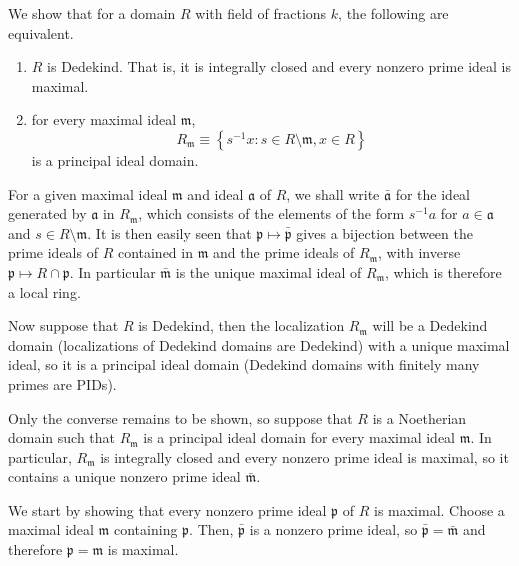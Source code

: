 \documentclass[12pt]{article}
\begin{document}
We show that for a  domain $R$ with field of fractions $k$, the following are equivalent.
\begin{enumerate}
\item $R$ is Dedekind. That is, it is integrally closed and every nonzero prime ideal is maximal.
\item for every maximal ideal $\mathfrak{m}$,
\begin{equation*}
R_\mathfrak{m}\equiv\left\{s^{-1}x:s\in R\setminus\mathfrak{m},x\in R\right\}
\end{equation*}
is a principal ideal domain.
\end{enumerate}

For a given maximal ideal $\mathfrak{m}$ and ideal $\mathfrak{a}$ of $R$, we shall write $\mathfrak{\bar a}$ for the ideal generated by $\mathfrak{a}$ in $R_\mathfrak{m}$, which consists of the elements of the form $s^{-1}a$ for $a\in\mathfrak{a}$ and $s\in R\setminus\mathfrak{m}$. It is then easily seen that $\mathfrak{p}\mapsto \mathfrak{\bar p}$ gives a bijection between the prime ideals of $R$ contained in $\mathfrak{m}$ and the prime ideals of $R_\mathfrak{m}$, with inverse $\mathfrak{p}\mapsto R\cap\mathfrak{p}$. In particular $\mathfrak{\bar m}$ is the unique maximal ideal of $R_\mathfrak{m}$, which is therefore a local ring.

Now suppose that $R$ is Dedekind, then the localization $R_\mathfrak{m}$ will be a Dedekind domain (localizations of Dedekind domains are Dedekind) with a unique maximal ideal, so it is a principal ideal domain (Dedekind domains with finitely many primes are PIDs).

Only the converse remains to be shown, so suppose that $R$ is a Noetherian domain such that $R_\mathfrak{m}$ is a principal ideal domain for every maximal ideal $\mathfrak{m}$. In particular, $R_\mathfrak{m}$ is integrally closed and every nonzero prime ideal is maximal, so it contains a unique nonzero prime ideal $\mathfrak{\bar m}$.

We start by showing that every nonzero prime ideal $\mathfrak{p}$ of $R$ is maximal. Choose a maximal ideal $\mathfrak{m}$ containing $\mathfrak{p}$. Then, $\mathfrak{\bar p}$ is a nonzero prime ideal, so $\mathfrak{\bar p}=\mathfrak{\bar m}$ and therefore $\mathfrak{p}=\mathfrak{m}$ is maximal.
\end{document}
